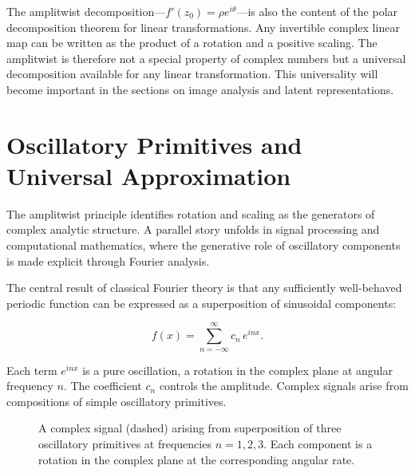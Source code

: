 \documentclass[11pt, a4paper]{article}
\theoremstyle{plain}
\theoremstyle{definition}
\theoremstyle{remark}
\begin{document}
The amplitwist decomposition---$f'(z_0) = \rho e^{i\theta}$---is also the content of
the polar decomposition theorem for linear transformations. Any invertible complex
linear map can be written as the product of a rotation and a positive scaling.
The amplitwist is therefore not a special property of complex numbers but a universal
decomposition available for any linear transformation. This universality will become
important in the sections on image analysis and latent representations.


\section{Oscillatory Primitives and Universal Approximation}

The amplitwist principle identifies rotation and scaling as the generators of complex
analytic structure. A parallel story unfolds in signal processing and computational
mathematics, where the generative role of oscillatory components is made explicit
through Fourier analysis.

The central result of classical Fourier theory is that any sufficiently well-behaved
periodic function can be expressed as a superposition of sinusoidal components:

\begin{equation}
f(x) = \sum_{n=-\infty}^{\infty} c_n\, e^{inx}.
\label{eq:fourier}
\end{equation}

Each term $e^{inx}$ is a pure oscillation, a rotation in the complex plane at angular
frequency $n$. The coefficient $c_n$ controls the amplitude. Complex signals arise from
compositions of simple oscillatory primitives.

\begin{figure}[h]
\centering
{}
\caption{A complex signal (dashed) arising from superposition of three oscillatory
primitives at frequencies $n=1,2,3$. Each component is a rotation in the complex plane
at the corresponding angular rate.}
\end{figure}
\end{document}
